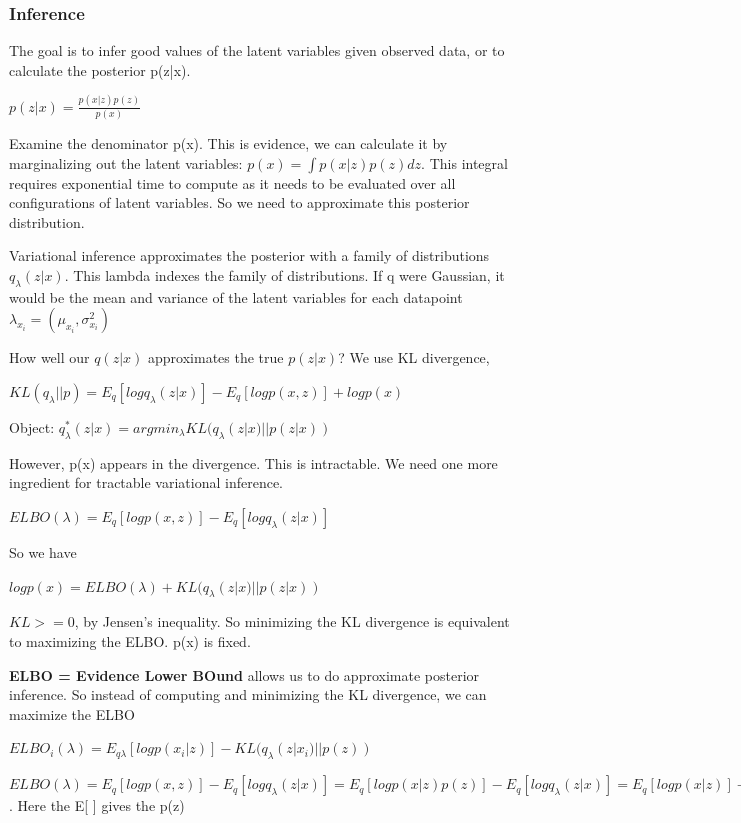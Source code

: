 \documentclass[a4paper]{article}
\begin{document}
\subsubsection{Inference}

The goal is to infer good values of the latent variables given observed data, or to calculate the posterior p(z|x).

$p(z|x) = \frac{p(x|z)p(z)}{p(x)}$

Examine the denominator p(x). This is evidence, we can calculate it by marginalizing out the latent variables:
$p(x) = \int p(x|z)p(z)dz$. This integral requires exponential time to compute as it needs to be evaluated over all configurations of latent variables. So we need to approximate this posterior distribution.

Variational inference approximates the posterior with a family of distributions $q_\lambda(z|x)$. This lambda indexes the family of distributions. If q were Gaussian, it would be the mean and variance of the latent variables for each datapoint $\lambda_{x_i}=(\mu_{x_i},\sigma^2_{x_i})$

How well our $q(z|x)$ approximates the true $p(z|x)$? We use KL divergence, 

$KL(q_\lambda||p) = E_q[log q_\lambda(z|x)] - E_q[log p(x,z)] + log p(x)$ 

Object: 
$q^*_\lambda(z|x) = arg min_\lambda KL(q_\lambda(z|x)||p(z|x))$

However, p(x) appears in the divergence. This is intractable. We need one more ingredient for tractable variational inference. 

$ELBO(\lambda) = E_q[log p(x,z)] - E_q[log q_\lambda(z|x)]$

So we have

$log p(x) = ELBO(\lambda) + KL(q_\lambda(z|x)||p(z|x))$

$KL >= 0 $, by Jensen's inequality. So minimizing the KL divergence is equivalent to maximizing the ELBO. p(x) is fixed.

{\bf ELBO = Evidence Lower BOund} allows us to do approximate posterior inference. So instead of computing and minimizing the KL divergence, we can maximize the ELBO

$ELBO_i(\lambda) = E_{q\lambda}[logp(x_i|z)] - KL(q_\lambda(z|x_i)||p(z))$

$ELBO(\lambda) = E_q[logp(x,z)] - E_q[logq_\lambda(z|x)] = 
E_q[log p(x|z)p(z)] - E_q[logq_\lambda(z|x)] = E_q[log p(x|z)] + E_q[log p(z)] - E_q[logq_\lambda(z|x)] = E_{q\lambda}[logp(x_i|z)] - KL(q_\lambda(z|x_i)||p(z))$. Here the E[ ] gives the p(z)
\end{document}
